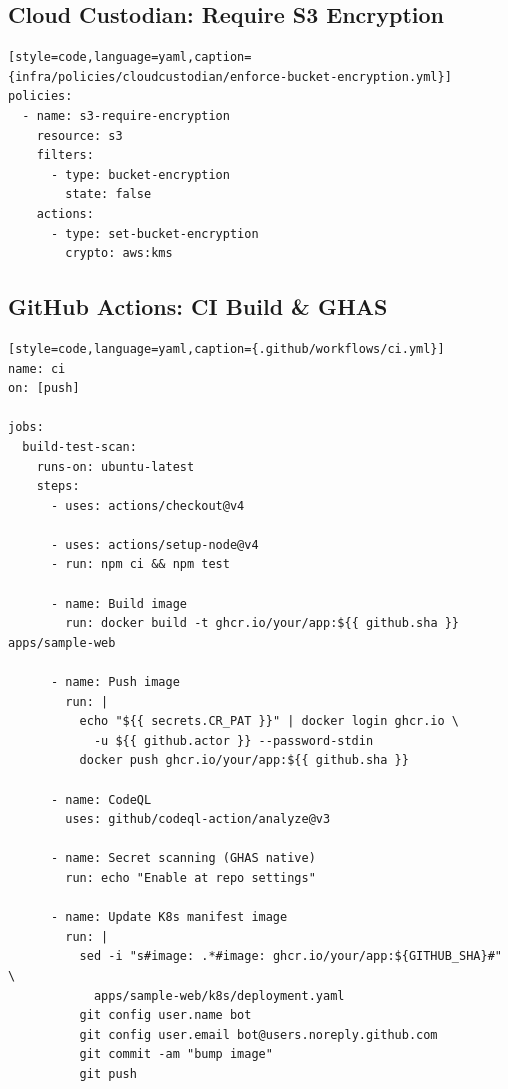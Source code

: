 \documentclass[11pt]{article}
\begin{document}
\subsection{Cloud Custodian: Require S3 Encryption}
\begin{verbatim}[style=code,language=yaml,caption={infra/policies/cloudcustodian/enforce-bucket-encryption.yml}]
policies:
  - name: s3-require-encryption
    resource: s3
    filters:
      - type: bucket-encryption
        state: false
    actions:
      - type: set-bucket-encryption
        crypto: aws:kms
\end{verbatim}

\subsection{GitHub Actions: CI Build \& GHAS}
\begin{verbatim}[style=code,language=yaml,caption={.github/workflows/ci.yml}]
name: ci
on: [push]

jobs:
  build-test-scan:
    runs-on: ubuntu-latest
    steps:
      - uses: actions/checkout@v4

      - uses: actions/setup-node@v4
      - run: npm ci && npm test

      - name: Build image
        run: docker build -t ghcr.io/your/app:${{ github.sha }} apps/sample-web

      - name: Push image
        run: |
          echo "${{ secrets.CR_PAT }}" | docker login ghcr.io \
            -u ${{ github.actor }} --password-stdin
          docker push ghcr.io/your/app:${{ github.sha }}

      - name: CodeQL
        uses: github/codeql-action/analyze@v3

      - name: Secret scanning (GHAS native)
        run: echo "Enable at repo settings"

      - name: Update K8s manifest image
        run: |
          sed -i "s#image: .*#image: ghcr.io/your/app:${GITHUB_SHA}#" \
            apps/sample-web/k8s/deployment.yaml
          git config user.name bot
          git config user.email bot@users.noreply.github.com
          git commit -am "bump image"
          git push
\end{verbatim}
\end{document}

